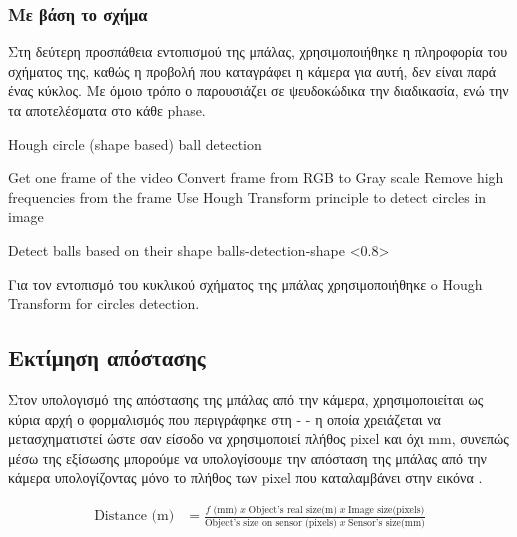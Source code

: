 \subsubsection{Με βάση το σχήμα}

Στη δεύτερη προσπάθεια εντοπισμού της μπάλας, χρησιμοποιήθηκε η πληροφορία του σχήματος της, καθώς η προβολή που καταγράφει η κάμερα για αυτή, δεν είναι παρά ένας κύκλος. Με όμοιο τρόπο ο  παρουσιάζει σε ψευδοκώδικα την διαδικασία, ενώ την  τα αποτελέσματα στο κάθε phase.

\begin{algorithm}[H]
	\caption[Hough circle (shape based) ball detection]{Hough circle (shape based) ball detection}\label{alg:hough-detect}
	\begin{algorithmic}[1]
            \State Get one frame of the video
            \State Convert frame from RGB to Gray scale
            \State Remove high frequencies from the frame
            \State Use Hough Transform principle to detect circles in image 
	\end{algorithmic}
\end{algorithm}

%
{Detect balls based on their shape}%
{balls-detection-shape}%
<0.8>

Για τον εντοπισμό του κυκλικού σχήματος της μπάλας χρησιμοποιήθηκε o Hough Transform for circles detection.



\subsection{Εκτίμηση απόστασης}
Στον υπολογισμό της απόστασης της μπάλας από την κάμερα, χρησιμοποιείται ως κύρια αρχή ο φορμαλισμός που περιγράφηκε στη  -  - η οποία χρειάζεται να μετασχηματιστεί ώστε σαν είσοδο να χρησιμοποιεί πλήθος pixel και όχι mm, συνεπώς μέσω της εξίσωσης  μπορούμε να υπολογίσουμε την απόσταση της μπάλας από την κάμερα υπολογίζοντας μόνο το πλήθος των pixel που καταλαμβάνει στην εικόνα \cite{calculate-distance-stackexchange} \cite{calculate-distance-or-size-of-an-objectin-a-photo-image}.

\begin{align}
	\textrm{Distance (m)} &= \frac{\textrm{$f$ (mm)}\; x\;\textrm{Object's real size(m)}\; x\; \textrm{Image size(pixels)}}{\textrm{Object's size on sensor (pixels)}\; x\; \textrm{Sensor's size(mm)}} \label{eq:distance-from-object-pixels}
\end{align}

